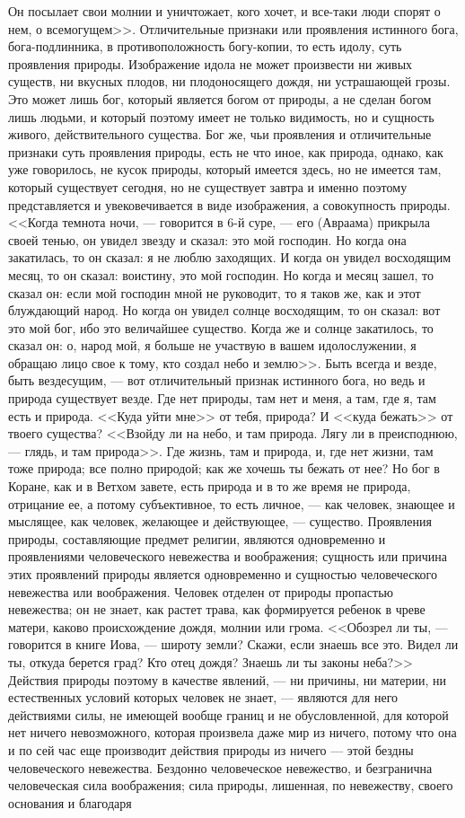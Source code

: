 \documentclass[12pt]{article}
\begin{document}
Он посылает свои молнии и уничтожает, кого хочет, и все-таки люди спорят о нем, о всемогущем>>. Отличительные признаки или проявления истинного бога, бога-подлинника, в противоположность богу-копии, то есть идолу, суть проявления природы. Изображение идола не может произвести ни живых существ, ни вкусных плодов, ни плодоносящего дождя, ни устрашающей грозы. Это может лишь бог, который является богом от природы, а не сделан богом лишь людьми, и который поэтому имеет не только видимость, но и сущность живого, действительного существа. Бог же, чьи проявления и отличительные признаки суть проявления природы, есть не что иное, как природа, однако, как уже говорилось, не кусок природы, который имеется здесь, но не имеется там, который существует сегодня, но не существует завтра и именно поэтому представляется и увековечивается в виде изображения, а совокупность природы. <<Когда темнота ночи, --- говорится в 6-й суре, --- его (Авраама) прикрыла своей тенью, он увидел звезду и сказал: это мой господин. Но когда она закатилась, то он сказал: я не люблю заходящих. И когда он увидел восходящим месяц, то он сказал: воистину, это мой господин. Но когда и месяц зашел, то сказал он: если мой господин мной не руководит, то я таков же, как и этот блуждающий народ. Но когда он увидел солнце восходящим, то он сказал: вот это мой бог, ибо это величайшее существо. Когда же и солнце закатилось, то сказал он: о, народ мой, я больше не участвую в вашем идолослужении, я обращаю лицо свое к тому, кто создал небо и землю>>. Быть всегда и везде, быть вездесущим, --- вот отличительный признак истинного бога, но ведь и природа существует везде. Где нет природы, там нет и меня, а там, где я, там есть и природа. <<Куда уйти мне>> от тебя, природа? И <<куда бежать>> от твоего существа? <<Взойду ли на небо, и там природа. Лягу ли в преисподнюю, --- глядь, и там природа>>. Где жизнь, там и природа, и, где нет жизни, там тоже природа; все полно природой; как же хочешь ты бежать от нее? Но бог в Коране, как и в Ветхом завете, есть природа и в то же время не природа, отрицание ее, а потому субъективное, то есть личное, --- как человек, знающее и мыслящее, как человек, желающее и действующее, --- существо. Проявления природы, составляющие предмет религии, являются одновременно и проявлениями человеческого невежества и воображения; сущность или причина этих проявлений природы является одновременно и сущностью человеческого невежества или воображения. Человек отделен от природы пропастью невежества; он не знает, как растет трава, как формируется ребенок в чреве матери, каково происхождение дождя, молнии или грома. <<Обозрел ли ты, --- говорится в книге Иова, --- широту земли? Скажи, если знаешь все это. Видел ли ты, откуда берется град? Кто отец дождя? Знаешь ли ты законы неба?>> Действия природы поэтому в качестве явлений, --- ни причины, ни материи, ни естественных условий которых человек не знает, --- являются для него действиями силы, не имеющей вообще границ и не обусловленной, для которой нет ничего невозможного, которая произвела даже мир из ничего, потому что она и по сей час еще производит действия природы из ничего --- этой бездны человеческого невежества. Бездонно человеческое невежество, и безгранична человеческая сила воображения; сила природы, лишенная, по невежеству, своего основания и благодаря 
\end{document}
